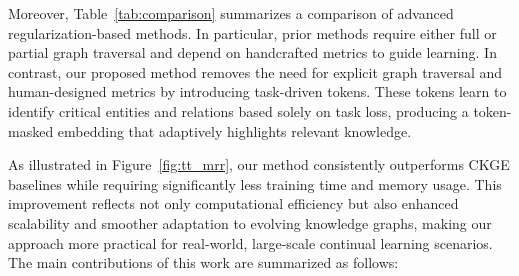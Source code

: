 \documentclass[runningheads]{llncs}
\begin{document}


% 

Moreover, Table~\ref{tab:comparison} summarizes a comparison of advanced regularization-based methods. In particular, prior methods require either full or partial graph traversal and depend on handcrafted metrics to guide learning. In contrast, our proposed method removes the need for explicit graph traversal and human-designed metrics by introducing task-driven tokens. These tokens learn to identify critical entities and relations based solely on task loss, producing a token-masked embedding that adaptively highlights relevant knowledge.


As illustrated in Figure~\ref{fig:tt_mrr}, our method consistently outperforms CKGE baselines while requiring significantly less training time and memory usage. This improvement reflects not only computational efficiency but also enhanced scalability and smoother adaptation to evolving knowledge graphs, making our approach more practical for real-world, large-scale continual learning scenarios. The main contributions of this work are summarized as follows:
\end{document}
